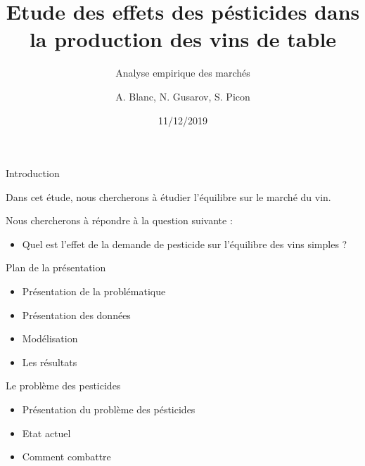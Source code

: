 \documentclass[11pt,ignorenonframetext,]{beamer}
\title{Etude des effets des pésticides dans la production des vins de table}
\subtitle{Analyse empirique des marchés}
\author{A. Blanc, N. Gusarov, S. Picon}
\institute{Université Grenoble Alpes}
\date{11/12/2019}
\providecommand{\tightlist}{%
  \setlength{\itemsep}{0pt}\setlength{\parskip}{0pt}}
\begin{document}
\frame{\titlepage}

\begin{frame}
\tableofcontents[hideallsubsections]
\end{frame}
\begin{frame}{Introduction}
\protect\hypertarget{introduction}{}

Dans cet étude, nous chercherons à étudier l'équilibre sur le marché du
vin.

Nous chercherons à répondre à la question suivante :

\begin{itemize}
\tightlist
\item
  Quel est l'effet de la demande de pesticide sur l'équilibre des vins
  simples ?
\end{itemize}

\end{frame}

\begin{frame}{Plan de la présentation}
\protect\hypertarget{plan-de-la-presentation}{}

\begin{itemize}
\tightlist
\item
  Présentation de la problématique
\item
  Présentation des données
\item
  Modélisation
\item
  Les résultats
\end{itemize}

\end{frame}

\begin{frame}{Le problème des pesticides}
\protect\hypertarget{le-probleme-des-pesticides}{}

\begin{itemize}
\tightlist
\item
  Présentation du problème des pésticides
\item
  Etat actuel
\item
  Comment combattre
\end{itemize}

\end{frame}
\end{document}
